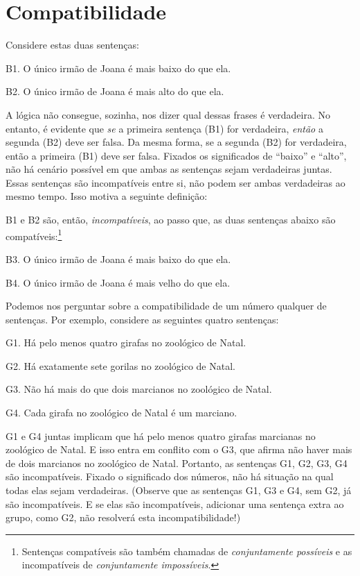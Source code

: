 \section{Compatibilidade}
Considere estas duas sentenças:
	\begin{ebullet}
		\item[B1.] O único irmão de Joana é mais baixo do que ela.
		\item[B2.] O único irmão de Joana é mais alto do que ela.
	\end{ebullet}	
A lógica não consegue, sozinha, nos dizer qual dessas frases é verdadeira.
No entanto, é evidente que \emph{se} a primeira sentença (B1) for verdadeira, \emph{então} a segunda (B2) deve ser falsa.
Da mesma forma, se a segunda (B2) for verdadeira, então a primeira (B1) deve ser falsa.
Fixados os significados de ``baixo'' e ``alto'', não há cenário possível em que ambas as sentenças sejam verdadeiras juntas.
Essas sentenças são incompatíveis entre si, não podem ser ambas verdadeiras ao mesmo tempo.
Isso motiva a seguinte definição:

B1 e B2 são, então, \emph{incompatíveis}, ao passo que, as duas sentenças abaixo são compatíveis:\footnote{
	Sentenças compatíveis são também chamadas de \textit{conjuntamente possíveis} e as incompatíveis de \textit{conjuntamente impossíveis}.}
	\begin{ebullet}
		\item[B3.] O único irmão de Joana é mais baixo do que ela.
		\item[B4.] O único irmão de Joana é mais velho do que ela.
	\end{ebullet}

Podemos nos perguntar sobre a compatibilidade de um número qualquer de sentenças.
Por exemplo, considere as seguintes quatro sentenças:
	\begin{ebullet}	
		\item[G1.] \label{MartianGiraffes} Há pelo menos quatro girafas no zoológico de Natal.
		\item[G2.] Há exatamente sete gorilas no zoológico de Natal.
		\item[G3.] Não há mais do que dois marcianos no zoológico de Natal.
		\item[G4.] Cada girafa no zoológico de Natal é um marciano.
	\end{ebullet}
G1 e G4 juntas implicam que há pelo menos quatro girafas marcianas no zoológico de Natal.
E isso entra em conflito com o G3, que afirma não haver mais de dois marcianos no zoológico de Natal.
Portanto, as sentenças G1, G2, G3, G4 são incompatíveis.
Fixado o significado dos números, não há situação na qual todas elas sejam verdadeiras. 
(Observe que as sentenças G1, G3 e G4, sem G2, já são incompatíveis.
E se elas são incompatíveis, adicionar uma sentença extra ao grupo, como G2, não resolverá esta incompatibilidade!)

